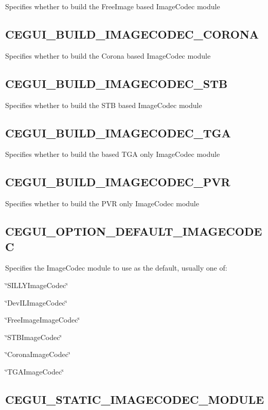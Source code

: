 Specifies whether to build the Free\+Image based Image\+Codec module \hypertarget{build_options_build_options_corona_codec}{}\subsection{C\+E\+G\+U\+I\+\_\+\+B\+U\+I\+L\+D\+\_\+\+I\+M\+A\+G\+E\+C\+O\+D\+E\+C\+\_\+\+C\+O\+R\+O\+NA}\label{build_options_build_options_corona_codec}
Specifies whether to build the Corona based Image\+Codec module \hypertarget{build_options_build_options_stb_codec}{}\subsection{C\+E\+G\+U\+I\+\_\+\+B\+U\+I\+L\+D\+\_\+\+I\+M\+A\+G\+E\+C\+O\+D\+E\+C\+\_\+\+S\+TB}\label{build_options_build_options_stb_codec}
Specifies whether to build the S\+TB based Image\+Codec module \hypertarget{build_options_build_options_tga_codec}{}\subsection{C\+E\+G\+U\+I\+\_\+\+B\+U\+I\+L\+D\+\_\+\+I\+M\+A\+G\+E\+C\+O\+D\+E\+C\+\_\+\+T\+GA}\label{build_options_build_options_tga_codec}
Specifies whether to build the based T\+GA only Image\+Codec module \hypertarget{build_options_build_options_pvr_codec}{}\subsection{C\+E\+G\+U\+I\+\_\+\+B\+U\+I\+L\+D\+\_\+\+I\+M\+A\+G\+E\+C\+O\+D\+E\+C\+\_\+\+P\+VR}\label{build_options_build_options_pvr_codec}
Specifies whether to build the P\+VR only Image\+Codec module \hypertarget{build_options_build_options_default_codec}{}\subsection{C\+E\+G\+U\+I\+\_\+\+O\+P\+T\+I\+O\+N\+\_\+\+D\+E\+F\+A\+U\+L\+T\+\_\+\+I\+M\+A\+G\+E\+C\+O\+D\+EC}\label{build_options_build_options_default_codec}
Specifies the Image\+Codec module to use as the default, usually one of\+:
\begin{DoxyItemize}
\item \char`\"{}\+S\+I\+L\+L\+Y\+Image\+Codec\char`\"{}
\item \char`\"{}\+Dev\+I\+L\+Image\+Codec\char`\"{}
\item \char`\"{}\+Free\+Image\+Image\+Codec\char`\"{}
\item \char`\"{}\+S\+T\+B\+Image\+Codec\char`\"{}
\item \char`\"{}\+Corona\+Image\+Codec\char`\"{}
\item \char`\"{}\+T\+G\+A\+Image\+Codec\char`\"{} 
\end{DoxyItemize}\hypertarget{build_options_build_options_staic_codec_lib}{}\subsection{C\+E\+G\+U\+I\+\_\+\+S\+T\+A\+T\+I\+C\+\_\+\+I\+M\+A\+G\+E\+C\+O\+D\+E\+C\+\_\+\+M\+O\+D\+U\+LE}\label{build_options_build_options_staic_codec_lib}
